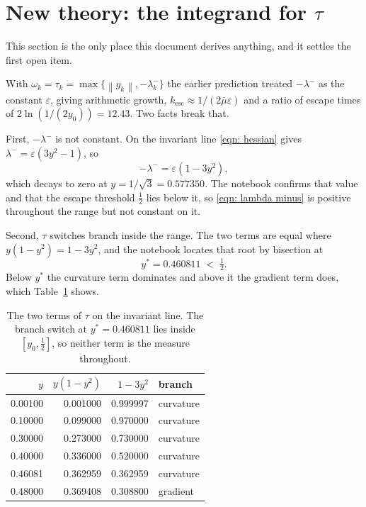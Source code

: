 \documentclass[11pt,a4paper]{article}
\providecommand{\norm}[1]{\left \lVert #1 \right \rVert}
\theoremstyle{definition}
\theoremstyle{remark}
\begin{document}
\section{New theory: the integrand for \texorpdfstring{$\tau$}{tau}}
\label{sec: tau theory}

This section is the only place this document derives anything, and it settles the
first open item.

With $\omega_k = \tau_k = \max\{\norm{g_k}, -\lambda_k^-\}$ the earlier
prediction treated $-\lambda^-$ as the constant $\varepsilon$, giving arithmetic
growth, $k_{\mathrm{esc}} \approx 1/(2\overline{\mu}\varepsilon)$ and a ratio of
escape times of $2\ln(1/(2y_0)) = 12.43$. Two facts break that.

First, $-\lambda^-$ is not constant. On the invariant line \eqref{eqn: hessian}
gives $\lambda^- = \varepsilon(3y^2-1)$, so
\begin{equation}
  -\lambda^- = \varepsilon(1 - 3y^2),
  \label{eqn: lambda minus}
\end{equation}
which decays to zero at $y = 1/\sqrt3 = 0.577350$. The notebook confirms that
value and that the escape threshold $\tfrac12$ lies below it, so
\eqref{eqn: lambda minus} is positive throughout the range but not constant on
it.

Second, $\tau$ switches branch inside the range. The two terms are equal where
$y(1-y^2) = 1-3y^2$, and the notebook locates that root by bisection at
\begin{equation}
  y^\ast = 0.460811 \;<\; \tfrac12 .
  \label{eqn: switch}
\end{equation}
Below $y^\ast$ the curvature term dominates and above it the gradient term does,
which Table~\ref{tab: branch} shows.

\begin{table}[H]
  \centering\small
  \caption{The two terms of $\tau$ on the invariant line. The branch switch at
    $y^\ast = 0.460811$ lies inside $[y_0, \tfrac12]$, so neither term is the
    measure throughout.}
  \label{tab: branch}
  \begin{tabular}{rrrl}
    \toprule
    $y$ & $y(1-y^2)$ & $1-3y^2$ & branch \\
    \midrule
    0.00100 & 0.001000 & 0.999997 & curvature \\
    0.10000 & 0.099000 & 0.970000 & curvature \\
    0.30000 & 0.273000 & 0.730000 & curvature \\
    0.40000 & 0.336000 & 0.520000 & curvature \\
    0.46081 & 0.362959 & 0.362959 & curvature \\
    0.48000 & 0.369408 & 0.308800 & gradient  \\
    \bottomrule
  \end{tabular}
\end{table}
\end{document}
